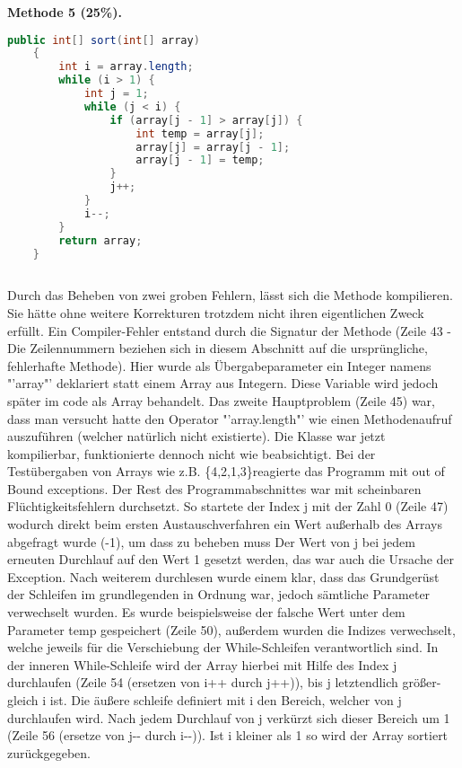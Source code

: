 \documentclass{pi1}
\begin{document}
\textbf{Methode 5 (25\%).}
\begin{lstlisting}[caption={Korrigierte sort() Methode}, firstnumber=27, language=Java]
public int[] sort(int[] array)
    {
        int i = array.length;
        while (i > 1) {
            int j = 1;
            while (j < i) {
                if (array[j - 1] > array[j]) {
                    int temp = array[j];
                    array[j] = array[j - 1];
                    array[j - 1] = temp;
                }
                j++;
            }
            i--;
        }
        return array;
    }
    
\end{lstlisting}
Durch das Beheben von zwei groben Fehlern, lässt sich die Methode kompilieren. Sie hätte ohne weitere Korrekturen trotzdem nicht ihren eigentlichen Zweck erfüllt.
Ein Compiler-Fehler entstand durch die Signatur der Methode (Zeile 43 - Die Zeilennummern beziehen sich in diesem Abschnitt auf die ursprüngliche, fehlerhafte Methode). Hier wurde als Übergabeparameter ein Integer namens "'array"' deklariert statt einem Array aus Integern. Diese Variable wird jedoch später im code als Array behandelt. Das zweite Hauptproblem (Zeile 45) war, dass man versucht hatte den Operator "'array.length"' wie einen Methodenaufruf auszuführen (welcher natürlich nicht existierte).\newline
Die Klasse war jetzt kompilierbar, funktionierte dennoch nicht wie beabsichtigt.
Bei der Testübergaben von Arrays wie z.B. \{4,2,1,3\}reagierte das Programm mit out of Bound exceptions. Der Rest des Programmabschnittes war mit scheinbaren Flüchtigkeitsfehlern durchsetzt. So startete der Index j mit der Zahl 0 (Zeile 47) wodurch direkt beim ersten Austauschverfahren ein Wert außerhalb des Arrays abgefragt wurde (-1), um dass zu beheben muss Der Wert von j bei jedem erneuten Durchlauf auf den Wert 1 gesetzt werden, das war auch die Ursache der Exception.\newline
Nach weiterem durchlesen wurde einem klar, dass das Grundgerüst der Schleifen im grundlegenden in Ordnung war, jedoch sämtliche Parameter verwechselt wurden. Es wurde beispielsweise der falsche Wert unter dem Parameter temp gespeichert (Zeile 50), außerdem wurden die Indizes verwechselt, welche jeweils für die Verschiebung der While-Schleifen verantwortlich sind.\newline
In der inneren While-Schleife wird der Array hierbei mit Hilfe des Index j durchlaufen (Zeile 54 (ersetzen von i++ durch j++)), bis j letztendlich größer-gleich i ist.
Die äußere schleife definiert mit i den Bereich, welcher von j durchlaufen wird. Nach jedem Durchlauf von j verkürzt sich dieser Bereich um 1 (Zeile 56 (ersetze von j-{}- durch i-{}-)).
Ist i kleiner als 1 so wird der Array sortiert zurückgegeben.
\end{document}
